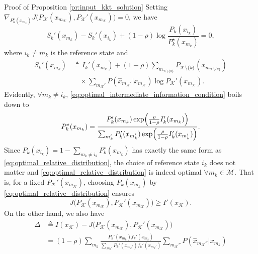 \documentclass[journal]{IEEEtran}
\begin{document}
\begin{appendix}
\begin{subsection}{Proof of Proposition \ref{pr:input_kkt_solution}}
		Setting $\nabla_{P_k^\star(x_{m_k})} J \bigl( P_{\mathcal{K}}(x_{m_{\mathcal{K}}}),P_{\mathcal{K}}'(x_{m_{\mathcal{K}}}) \bigr) = 0$, we have
		\begin{equation}
			S_k'(x_{m_k}) - S_k'(x_{i_k}) + (1 - \rho) \log \frac{P_k(x_{i_k})}{P_k^\star(x_{m_k})} = 0,
			\label{eq:optimal_intermediate_information_condition}
		\end{equation}
		where $i_k \ne m_k$ is the reference state and
		\begin{align}
			S_k'(x_{m_k})
			 & \triangleq I_k'(x_{m_k}) + (1 - \rho) \sum_{m_{\mathcal{K} \setminus \{k\}}} P_{\mathcal{K} \setminus \{k\}}(x_{m_{\mathcal{K} \setminus \{k\}}})\nonumber \\
			 & \quad \times \sum_{m_{\mathcal{K}}'} P(\hat{x}_{m_{\mathcal{K}}'}|x_{m_{\mathcal{K}}}) \log P_{\mathcal{K}}'(x_{m_{\mathcal{K}}}).
		\end{align}
		Evidently, $\forall m_k \ne i_k$, \eqref{eq:optimal_intermediate_information_condition} boils down to
		\begin{equation}
			P_k^\star(x_{m_k}) = \frac{P_k'(x_{m_k}) \exp \Bigl( \frac{\rho}{1 - \rho} I_k'(x_{m_k}) \Bigr)}{\sum_{m_k'} P_k'(x_{m_k'}) \exp \Bigl( \frac{\rho}{1 - \rho} I_k'(x_{m_k'}) \Bigr)}.
			\label{eq:optimal_relative_distribution}
		\end{equation}
		Since $P_k(x_{i_k}) = 1 - \sum_{m_k \ne i_k} P_k^\star(x_{m_k})$ has exactly the same form as \eqref{eq:optimal_relative_distribution}, the choice of reference state $i_k$ does not matter and \eqref{eq:optimal_relative_distribution} is indeed optimal $\forall m_k \in \mathcal{M}$.
		That is, for a fixed $P_{\mathcal{K}}'(x_{m_{\mathcal{K}}})$, choosing $P_k(x_{m_k})$ by \eqref{eq:optimal_relative_distribution} ensures
		\begin{equation}
			J \bigl( P_{\mathcal{K}}(x_{m_{\mathcal{K}}}),P_{\mathcal{K}}'(x_{m_{\mathcal{K}}}) \bigr) \ge I'(x_{\mathcal{K}}).
			\label{eq:information_difference_lower}
		\end{equation}
		On the other hand, we also have
		\begin{subequations}
			\label{eq:information_difference_upper}
			\begin{align}
				\Delta
				 & \triangleq I(x_{\mathcal{K}}) - J \bigl( P_{\mathcal{K}}(x_{m_{\mathcal{K}}}),P_{\mathcal{K}}'(x_{m_{\mathcal{K}}}) \bigr)                                                                                  \\
				 & = (1 - \rho) \sum_{m_k} \frac{P_k'(x_{m_k}) f_k'(x_{m_k})}{\sum_{m_k'} P_k'(x_{m_k'}) f_k'(x_{m_k'})} \sum_{m_{\mathcal{K}}''} P(\hat{x}_{m_{\mathcal{K}}''}|x_{m_k})\nonumber                              \\

\end{align}
\end{subequations}
\end{subsection}
\end{appendix}
\end{document}
